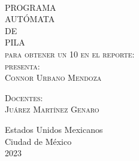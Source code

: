 \begin{titlepage}
\begin{minipage}[c][0.81\textheight][t]{0.75\textwidth}
\begin{center}
      {\color{red}{\large\scshape Titulo del Reporte }}\\[.2in]

      \vspace{2cm}            

      \textsc{\LARGE P\hspace{0.5cm}R\hspace{0.5cm}O\hspace{0.5cm}G\hspace{0.5cm}R\hspace{0.5cm}A\hspace{0.5cm}M\hspace{0.5cm}A\hspace{0.5cm}}\\[1cm]
      \textsc{\LARGE A\hspace{0.5cm}U\hspace{0.5cm}T\hspace{0.5cm}Ó\hspace{0.5cm}M\hspace{0.5cm}A\hspace{0.5cm}T\hspace{0.5cm}A}\\[1cm]
      \textsc{\LARGE  \hspace{0.5cm}D\hspace{0.5cm}E}\\[1cm]
      \textsc{\LARGE\hspace{0.5cm}P\hspace{0.5cm}I\hspace{0.5cm}L\hspace{0.5cm}A}
      \\[1cm]
      \textsc{\large para obtener un 10 en el reporte:}\\[0.2cm]
      
      {\color{red}\textsc{\large presenta:}}\\[0.2cm]
      \textsc{\large {Connor Urbano Mendoza}}\\[1cm]          

      \vspace{0.5cm}

      {\large\scshape 
        {\color{red}Docentes:}\\[0.3cm] {Juárez Martínez Genaro}}\\[.2in]

      \vspace{1cm}

      \large{Estados Unidos Mexicanos\\ 
        Ciudad de México\\
        2023}
    \end{center}
  \end{minipage}
\end{titlepage}
